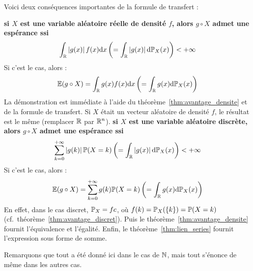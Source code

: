 \documentclass[../integ-proba.tex]{subfiles}
\begin{document}
    \begin{rem}
        \label{rem:important_moments}
        Voici deux conséquences importantes de la formule de transfert :
        \begin{itemize}
            \itemb \textbf{si $X$ est une variable aléatoire réelle de densité $f$, alors $g \circ X$ admet une espérance ssi}
            \begin{displaymath}
                \int_{\mathbb{R}} \left|g(x)\right| f(x) \textnormal{d}x \left(= \int_{\mathbb{R}} \left|g(x)\right| \textnormal{d} \mathbb{P}_X(x) \right) < + \infty
            \end{displaymath}
            Si c'est le cas, alors :
            \begin{displaymath}
                \mathbb{E}(g \circ X) = \int_{\mathbb{R}} g(x) f(x) \textnormal{d}x \left(= \int_{\mathbb{R}} g(x) \textnormal{d} \mathbb{P}_X(x) \right)
            \end{displaymath}
            La démonstration est immédiate à l'aide du théorème~\ref{thm:avantage_densite} et de la formule de transfert.
            Si $X$ était un vecteur aléatoire de densité $f$, le résultat est le même (remplacer $\mathbb{R}$ par $\mathbb{R}^n$).
            \itemb \textbf{si $X$ est une variable aléatoire discrète, alors $g \circ X$ admet une espérance ssi}
            \begin{displaymath}
                \sum_{k=0}^{+\infty} \left|g(k)\right| \mathbb{P}(X=k) \left(= \int_{\mathbb{R}} \left|g(x)\right| \textnormal{d} \mathbb{P}_X(x) \right) < + \infty
            \end{displaymath}
            Si c'est le cas, alors :
            \begin{displaymath}
                \mathbb{E}(g \circ X) = \sum_{k=0}^{+\infty} g(k) \mathbb{P}(X=k) \left(= \int_{\mathbb{R}} g(x) \textnormal{d} \mathbb{P}_X(x) \right)
            \end{displaymath}
            En effet, dans le cas discret, $\mathbb{P}_X = fc$, où $f(k) = \mathbb{P}_X(\left\{ k \right\}) = \mathbb{P}(X = k)$ (cf.\ théorème~\ref{thm:avantage_discret}).
            Puis le théorème~\ref{thm:avantage_densite} fournit l'équivalence et l'égalité.
            Enfin, le théorème~\ref{thm:lien_series} fournit l'expression sous forme de somme.

            Remarquons que tout a été donné ici dans le cas de $\mathbb{N}$, mais tout s'énonce de même dans les autres cas.
        \end{itemize}


\end{rem}
\end{document}
